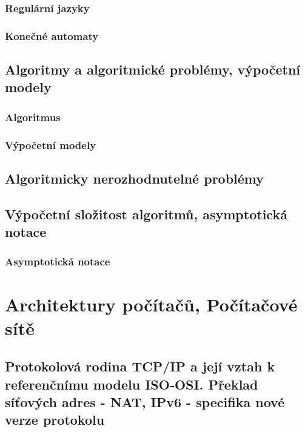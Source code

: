 \documentclass[10pt,a4paper]{article}
\begin{document}
\subsubsection{Regulární jazyky}
\subsubsection{Konečné automaty}

\subsection{Algoritmy a algoritmické problémy, výpočetní modely}
\subsubsection{Algoritmus}
\subsubsection{Výpočetní modely}

\subsection{Algoritmicky nerozhodnutelné problémy}
\subsection{Výpočetní složitost algoritmů, asymptotická notace}
\subsubsection{Asymptotická notace}
\newpage
\section{Architektury počítačů, Počítačové sítě}
\subsection{Protokolová rodina TCP/IP a její vztah k referenčnímu modelu ISO‐OSI. Překlad síťových adres - NAT, IPv6 - specifika nové verze protokolu}
\end{document}
